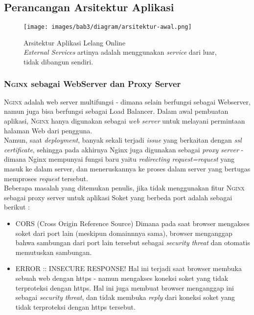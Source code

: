 \subsection{Perancangan Arsitektur Aplikasi}
	
      \begin{figure}[H]
        \centering
        \texttt{[image: images/bab3/diagram/arsitektur-awal.png]}
        \caption{Arsitektur Aplikasi Lelang Online 
        		\\
                \textit{External Services} artinya adalah menggunakan \textit{service} dari luar, tidak dibangun sendiri. }
        \label{arsitektur-app-final}
      \end{figure}
    
    \subsubsection{\textbf{\textsc{Nginx} sebagai WebServer dan Proxy Server}}
    {\scshape Nginx} adalah web server multifungsi - dimana selain berfungsi sebagai Webserver, namun juga bisa berfungsi sebagai Load Balancer. Dalam awal pembuatan aplikasi, \textsc{Nginx} hanya digunakan sebagai \textit{web server} untuk melayani permintaan halaman Web dari pengguna.
    \\
    Namun, saat \textit{deployment}, banyak sekali terjadi \textit{issue} yang berkaitan dengan \textit{ssl certificate}, sehingga pada akhirnya Nginx juga digunakan sebagai \textit{proxy server} - dimana Nginx mempunyai fungsi baru yaitu \textit{redirecting request=request} yang masuk ke dalam server, dan meneruskannya ke proses dalam server yang bertugas memproses \textit{request} tersebut.
	   \\
    Beberapa masalah yang ditemukan penulis, jika tidak menggunakan fitur \textsc{Nginx} sebagai proxy server untuk aplikasi Soket yang berbeda port adalah sebagai berikut :
	    \begin{itemize}[noitemsep,topsep=0pt]
	    \item CORS (Cross Origin Reference Source)
	    \newline
	    Dimana pada saat browser mengakses soket dari port lain (meskipun domainnnya sama), browser menganggap bahwa sambungan dari port lain tersebut sebagai \textit{security threat} dan otomatis memutuskan sambungan.
	    \item ERROR :: INSECURE RESPONSE!
	    \newline
	    Hal ini terjadi saat browser membuka sebuah web dengan https - namun mengakses koneksi soket yang tidak terproteksi dengan https. Hal ini juga membuat browser menganggap ini sebagai \textit{security threat}, dan tidak membuka \textit{reply} dari koneksi soket yang tidak terproteksi dengan https tersebut.
	    \end{itemize}
    
